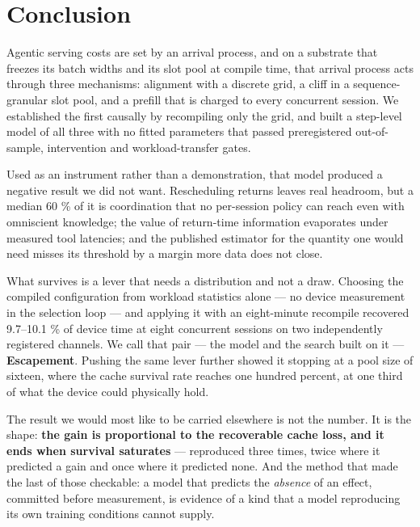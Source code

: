 
\section{Conclusion}
\label{sec:10}

Agentic serving costs are set by an arrival process, and on a substrate that freezes its batch widths and its slot pool at compile time, that arrival process acts through three mechanisms: alignment with a discrete grid, a cliff in a sequence-granular slot pool, and a prefill that is charged to every concurrent session. We established the first causally by recompiling only the grid, and built a step-level model of all three with no fitted parameters that passed preregistered out-of-sample, intervention and workload-transfer gates.

Used as an instrument rather than a demonstration, that model produced a negative result we did not want. Rescheduling returns leaves real headroom, but a median 60 \% of it is coordination that no per-session policy can reach even with omniscient knowledge; the value of return-time information evaporates under measured tool latencies; and the published estimator for the quantity one would need misses its threshold by a margin more data does not close.

What survives is a lever that needs a distribution and not a draw. Choosing the compiled configuration from workload statistics alone --- no device measurement in the selection loop --- and applying it with an eight-minute recompile recovered 9.7--10.1 \% of device time at eight concurrent sessions on two independently registered channels. We call that pair --- the model and the search built on it --- \textbf{Escapement}. Pushing the same lever further showed it stopping at a pool size of sixteen, where the cache survival rate reaches one hundred percent, at one third of what the device could physically hold.

The result we would most like to be carried elsewhere is not the number. It is the shape: \textbf{the gain is proportional to the recoverable cache loss, and it ends when survival saturates} --- reproduced three times, twice where it predicted a gain and once where it predicted none. And the method that made the last of those checkable: a model that predicts the \emph{absence} of an effect, committed before measurement, is evidence of a kind that a model reproducing its own training conditions cannot supply.
